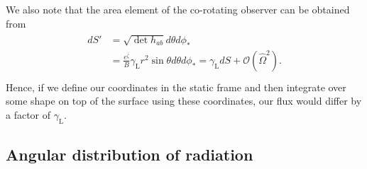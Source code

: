 \documentclass[iop, usenatbib]{emulateapj}
\newcommand{\be}{\begin{equation}}
\newcommand{\ee}{\end{equation}}
\newcommand{\sch}{Schwarzschild }
\newcommand{\rb}{\ensuremath{\bar{r}}}
\newcommand{\Ob}{\ensuremath{\hat{\Omega}}}
\newcommand{\nub}{\ensuremath{\bar{\nu}}}
\newcommand{\zetab}{\ensuremath{\bar{\zeta}}}
\newcommand{\Bb}{\ensuremath{\bar{B}}}
\newcommand{\lgamma}{\gamma_{\text{L}}}
\begin{document}
We also note that the area element of the co-rotating observer can be obtained from
\begin{align}\begin{split}
dS' &= \sqrt{\det h_{ab}} d\theta d\phi_* \\
&= \frac{e^{\zetab}}{B} \lgamma r^2 \sin\theta d\theta d\phi_* = \lgamma dS + \mathcal{O}(\Ob^2). \\
\end{split}\end{align}
Hence, if we define our coordinates in the static frame and then
integrate over some shape on top of the surface using these coordinates,
our flux would differ by a factor of $\lgamma$.


\subsection{Angular distribution of radiation}
\end{document}
